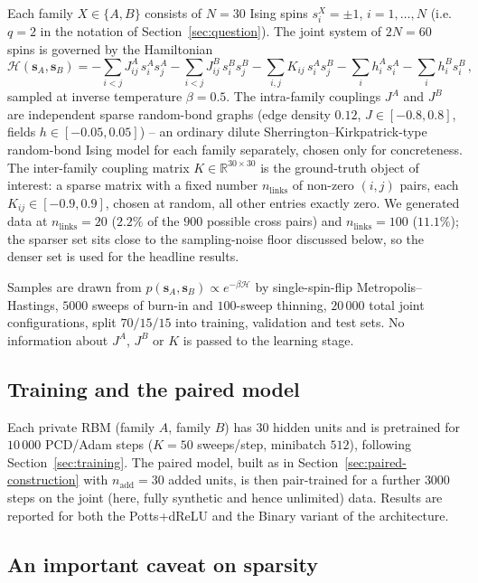 \documentclass[11pt]{article}
\begin{document}
Each family $X\in\{A,B\}$ consists of $N=30$ Ising spins $s^X_i=\pm1$,
$i=1,\dots,N$ (i.e.\ $q=2$ in the notation of
Section~\ref{sec:question}). The joint system of $2N=60$ spins is
governed by the Hamiltonian
\begin{equation}
\mathcal{H}(\bm{s}_A,\bm{s}_B) = -\sum_{i<j} J^A_{ij}\,s^A_i s^A_j
-\sum_{i<j} J^B_{ij}\,s^B_i s^B_j
-\sum_{i,j} K_{ij}\,s^A_i s^B_j
-\sum_i h^A_i s^A_i -\sum_i h^B_i s^B_i \, ,
\label{eq:hamiltonian}
\end{equation}
sampled at inverse temperature $\beta=0.5$. The intra-family couplings
$J^A$ and $J^B$ are independent sparse random-bond graphs (edge density
$0.12$, $J\in[-0.8,0.8]$, fields $h\in[-0.05,0.05]$) -- an ordinary dilute
Sherrington--Kirkpatrick-type random-bond Ising model for each family
separately, chosen only for concreteness. The inter-family coupling
matrix $K\in\mathbb{R}^{30\times30}$ is the ground-truth object of
interest: a sparse matrix with a fixed number $n_{\mathrm{links}}$ of
non-zero $(i,j)$ pairs, each $K_{ij}\in[-0.9,0.9]$, chosen at random,
all other entries exactly zero. We generated data at
$n_{\mathrm{links}}=20$ ($2.2\%$ of the $900$ possible cross pairs) and
$n_{\mathrm{links}}=100$ ($11.1\%$); the sparser set sits close to the
sampling-noise floor discussed below, so the denser set is used for the
headline results.

Samples are drawn from $p(\bm{s}_A,\bm{s}_B)\propto e^{-\beta\mathcal H}$
by single-spin-flip Metropolis--Hastings, $5000$ sweeps of burn-in and
$100$-sweep thinning, $20\,000$ total joint configurations, split
$70/15/15$ into training, validation and test sets. No information about
$J^A$, $J^B$ or $K$ is passed to the learning stage.

\subsection{Training and the paired model}

Each private RBM (family $A$, family $B$) has $30$ hidden units and is
pretrained for $10\,000$ PCD/Adam steps ($K=50$ sweeps/step, minibatch
$512$), following Section~\ref{sec:training}. The paired model, built as
in Section~\ref{sec:paired-construction} with $n_{\mathrm{add}}=30$ added
units, is then pair-trained for a further $3000$ steps on the joint
(here, fully synthetic and hence unlimited) data. Results are reported
for both the Potts+dReLU and the Binary variant of the architecture.

\subsection{An important caveat on sparsity}
\label{sec:sparsity}
\end{document}

